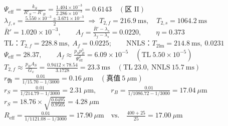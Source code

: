 \documentclass[border=3pt,multi=eqpage]{standalone}
\newenvironment{eqpage}{$\displaystyle}{$}
\begin{document}
\begin{eqpage}\Psi_{\mathrm{eff}}=\frac{k_S}{R'_S-R'_B}=\frac{1.404\times10^{-3}}{2.286\times10^{-3}}=0.6143\quad(\text{区 II})\end{eqpage}
\begin{eqpage}\lambda_{f,s}=\frac{5.550\times10^{-3}\pm3.671\times10^{-3}}{2}\;\Rightarrow\;T_{2,f}=216.9\ \mathrm{ms},\quad T_{2,s}=1064.2\ \mathrm{ms}\end{eqpage}
\begin{eqpage}\bar R'=1.020\times10^{-3},\qquad A_f=\frac{\bar R'-\lambda_s}{\lambda_f-\lambda_s}=0.0220,\qquad \eta=0.373\end{eqpage}
\begin{eqpage}\text{TL：}T_{2,f}=228.8\ \mathrm{ms},\ A_f=0.0225;\qquad \text{NNLS：}T_{2\mathrm{lm}}=214.8\ \mathrm{ms},\ 0.0231\end{eqpage}
\begin{eqpage}\Psi_{\mathrm{eff}}=28.37,\qquad A_f\approx\frac{p_Sp_B^3}{\Psi_{\mathrm{eff}}^2}=6.09\times10^{-5}\quad(\text{TL}\ 5.50\times10^{-5})\end{eqpage}
\begin{eqpage}T_{2,f}\approx\frac{p_BA_S}{G_x}=\frac{0.9412\times78.54}{3.1728}=23.3\ \mathrm{ms}\quad(\text{TL}\ 23.0,\ \text{NNLS}\ 15.7\ \mathrm{ms})\end{eqpage}
\begin{eqpage}r_{\text{伪}}=\frac{0.01}{1/15.70-1/3000}=0.16\ \mu\mathrm{m}\quad(\text{真值}\ 5\ \mu\mathrm{m})\end{eqpage}
\begin{eqpage}r_S=\frac{0.01}{1/214.79-1/3000}=2.31\ \mu\mathrm{m},\qquad r_B=\frac{0.01}{1/1086.72-1/3000}=17.04\ \mu\mathrm{m}\end{eqpage}
\begin{eqpage}r_S=18.76\times\sqrt{\frac{0.0495}{0.9505}}=4.28\ \mu\mathrm{m}\end{eqpage}
\begin{eqpage}R_{\mathrm{eff}}=\frac{0.01}{1/1121.08-1/3000}=17.90\ \mu\mathrm{m}\quad\text{vs.}\quad\frac{400+25}{25}=17.00\ \mu\mathrm{m}\end{eqpage}
\end{document}
